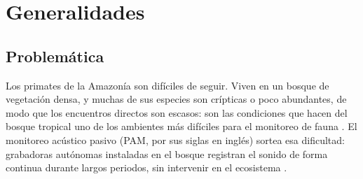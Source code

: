 \chapter{Generalidades}
\label{cap:generalidades}

\section{Problemática}
\label{sec:problematica}
\label{sec:problema}
%
%

Los primates de la Amazonía son difíciles de seguir. Viven en un bosque de
vegetación densa, y muchas de sus especies son crípticas o poco abundantes, de
modo que los encuentros directos son escasos: son las condiciones que hacen del
bosque tropical uno de los ambientes más difíciles para el monitoreo de fauna
\citep{zwerts_methods_2021}. El monitoreo acústico pasivo (PAM, por sus siglas en
inglés) sortea esa dificultad: grabadoras autónomas instaladas en el bosque
registran el sonido de forma continua durante largos periodos, sin intervenir en
el ecosistema \citep{gibb_2018}.

